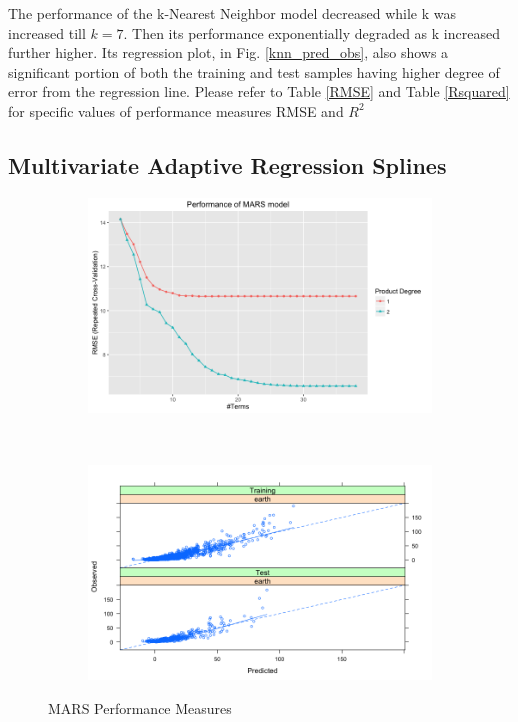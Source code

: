 \documentclass[letterpaper,12pt,titlepage,oneside,final]{report}
\begin{document}
            The performance of the k-Nearest Neighbor model decreased while k was increased till $k = 7$. Then its performance exponentially degraded as k increased further higher. Its regression plot, in Fig. \ref{knn_pred_obs}, also shows a significant portion of both the training and test samples having higher degree of error from the regression line. Please refer to Table \ref{RMSE} and Table \ref{Rsquared} for specific values of performance measures RMSE and $R^2$

        \subsection {Multivariate Adaptive Regression Splines}
            \begin{figure}[!ht]
            \begin{subfigure}[t]{0.5\textwidth}
                \centering
                \includegraphics[width=1.1\textwidth]{marsresults}
                \caption{}
                \label{marsresults}
            \end{subfigure}%
                ~ 
            \begin{subfigure}[t]{0.5\textwidth}
                \centering
                \includegraphics[width=1.1\textwidth]{mars_pred_obs}
                \caption{}
                \label{mars_pred_obs}
            \end{subfigure}
            \caption{MARS Performance Measures}
            \end{figure}
\end{document}
